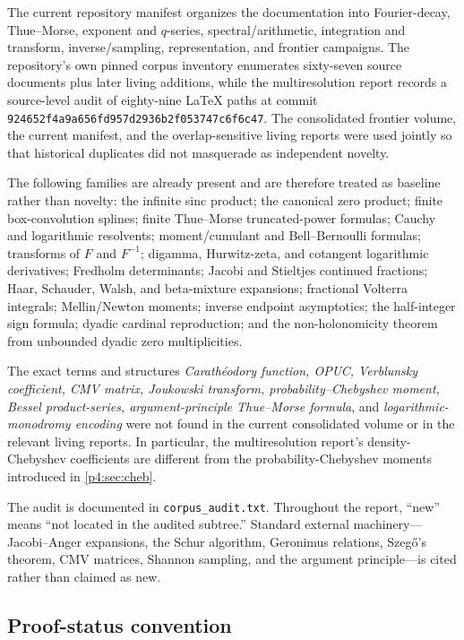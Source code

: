 \documentclass[11pt,oneside]{article}
\theoremstyle{definition}
\begin{document}
The current repository manifest organizes the documentation into Fourier-decay,
Thue--Morse, exponent and \(q\)-series, spectral/arithmetic, integration and transform,
inverse/sampling, representation, and frontier campaigns. The repository's own pinned
corpus inventory enumerates sixty-seven source documents plus later living additions, while
the multiresolution report records a source-level audit of eighty-nine \LaTeX{} paths at
commit \texttt{924652f4a9a656fd957d2936b2f053747c6f6c47}. The consolidated frontier volume,
the current manifest, and the overlap-sensitive living reports were used jointly so that
historical duplicates did not masquerade as independent novelty.

The following families are already present and are therefore treated as baseline rather
than novelty: the infinite sinc product; the canonical zero product; finite box-convolution
splines; finite Thue--Morse truncated-power formulas; Cauchy and logarithmic resolvents;
moment/cumulant and Bell--Bernoulli formulas; transforms of \(F\) and \(F^{-1}\); digamma,
Hurwitz-zeta, and cotangent logarithmic derivatives; Fredholm determinants; Jacobi and
Stieltjes continued fractions; Haar, Schauder, Walsh, and beta-mixture expansions;
fractional Volterra integrals; Mellin/Newton moments; inverse endpoint asymptotics; the
half-integer sign formula; dyadic cardinal reproduction; and the non-holonomicity theorem
from unbounded dyadic zero multiplicities.

The exact terms and structures \emph{Carath\'eodory function, OPUC, Verblunsky coefficient,
CMV matrix, Joukowski transform, probability--Chebyshev moment, Bessel product-series,
argument-principle Thue--Morse formula}, and \emph{logarithmic-monodromy encoding} were not
found in the current consolidated volume or in the relevant living reports. In particular,
the multiresolution report's density-Chebyshev coefficients are different from the
probability-Chebyshev moments introduced in \cref{p4:sec:cheb}.

\begin{baselinebox}
The audit is documented in \texttt{corpus\_audit.txt}. Throughout the report, ``new'' means
``not located in the audited \repoPartc{} subtree.'' Standard external machinery---Jacobi--Anger
expansions, the Schur algorithm, Geronimus relations, Szeg\H{o}'s theorem, CMV matrices,
Shannon sampling, and the argument principle---is cited rather than claimed as new.
\end{baselinebox}

\subsection{Proof-status convention}
\end{document}
